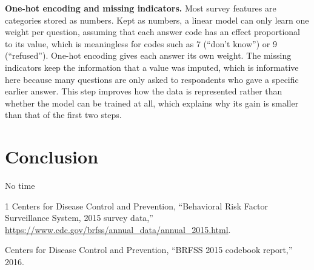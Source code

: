 \documentclass[10pt,conference]{IEEEtran}
\begin{document}
\textbf{One-hot encoding and missing indicators.} Most survey features are
categories stored as numbers. Kept as numbers, a linear model can only learn
one weight per question, assuming that each answer code has an effect
proportional to its value, which is meaningless for codes such as 7
(``don't know'') or 9 (``refused''). One-hot encoding gives each answer its
own weight. The missing indicators keep the information that a value was
imputed, which is informative here because many questions are only asked to
respondents who gave a specific earlier answer. This step improves how the
data is represented rather than whether the model can be trained at all,
which explains why its gain is smaller than that of the first two steps.

\section{Conclusion}

No time

\begin{thebibliography}{1}
Centers for Disease Control and Prevention, ``Behavioral Risk Factor
Surveillance System, 2015 survey data,''
\url{https://www.cdc.gov/brfss/annual_data/annual_2015.html}.

Centers for Disease Control and Prevention, ``BRFSS 2015 codebook report,''
2016.
\end{thebibliography}
\end{document}
